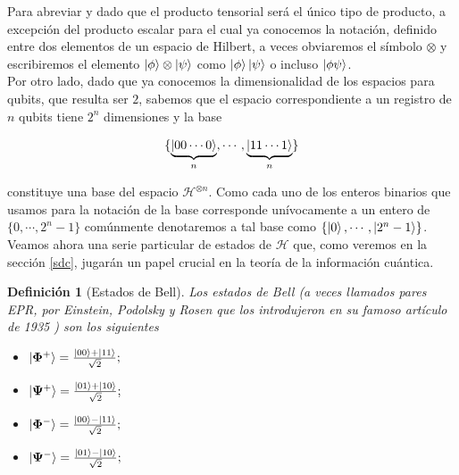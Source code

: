 \documentclass[11pt, spanish]{report}
\numberwithin{equation}{section}
\newtheorem{defin}{Definición}[section]
\numberwithin{defin}{section}
\newenvironment{purpleBox}{\begin{tcolorbox}[colback=purple!3!white,colframe=purple!75!black]}{\end{tcolorbox}}
\begin{document}
Para abreviar y dado que el producto tensorial será el único tipo de producto, a excepción del producto escalar para el cual ya conocemos la notación, definido entre dos elementos de un espacio de Hilbert, a veces obviaremos el símbolo $\otimes$ y escribiremos el elemento $\ket{\phi}\otimes \ket{\psi}$ como $\ket{\phi}\ket{\psi}$ o incluso $\ket{\phi\psi}$.\\

Por otro lado, dado que ya conocemos la dimensionalidad de los espacios para qubits, que resulta ser $2$, sabemos que el espacio correspondiente a un registro de $n$ qubits tiene $2^n$ dimensiones y la base

\begin{equation}
\{\underbrace{\ket{00\cdots 0}}_n,\cdots,\underbrace{\ket{11\cdots 1}}_n\}
\end{equation}

\noindent constituye una base del espacio $\mathcal{H}^{\otimes n}$. Como cada uno de los enteros binarios que usamos para la notación de la base corresponde unívocamente a un entero de $\{0,\cdots, 2^n-1\}$ comúnmente denotaremos a tal base como $\{\ket{0},\cdots,\ket{2^n-1}\}$.\\

Veamos ahora una serie particular de estados de $\mathcal{H}$ que, como veremos en la sección \ref{sdc}, jugarán un papel crucial en la teoría de la información cuántica.\\


\begin{purpleBox}
\begin{defin}[Estados de Bell] Los estados de Bell (a veces llamados pares EPR, por Einstein, Podolsky y Rosen que los introdujeron en su famoso artículo de 1935 \cite{einstein1935can} ) son los siguientes\\

\begin{minipage}{0.5\textwidth}
\begin{itemize}
\item $\ket{\mathbf{\Phi}^+}=\frac{\ket{00}+\ket{11}}{\sqrt{2}};$
\item $\ket{\mathbf{\Psi}^+}=\frac{\ket{01}+\ket{10}}{\sqrt{2}};$
\end{itemize}
\end{minipage}
\begin{minipage}{0.5\textwidth}
\begin{itemize}
\item $\ket{\mathbf{\Phi}^-}=\frac{\ket{00}-\ket{11}}{\sqrt{2}};$
\item $\ket{\mathbf{\Psi}^-}=\frac{\ket{01}-\ket{10}}{\sqrt{2}};$
\end{itemize}
\end{minipage}
\end{defin}
\end{purpleBox}
\end{document}
